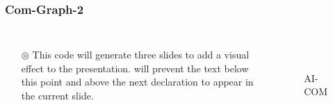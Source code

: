 \documentclass[10pt]{beamer}
\begin{document}
	\begin{frame}
		\frametitle{Com-Graph-2}
		\begin{columns}
			\begin{itemize}
				\item[$\circledcirc$] This code will generate three slides to add a visual effect to the presentation. will prevent the text below this point and above the next declaration to appear in the current slide.
			\end{itemize}
			
			\begin{figure}
				\centering
				\\
				\caption{AI-COM}
			\end{figure}
		\end{columns}
	\end{frame}
\end{document}
